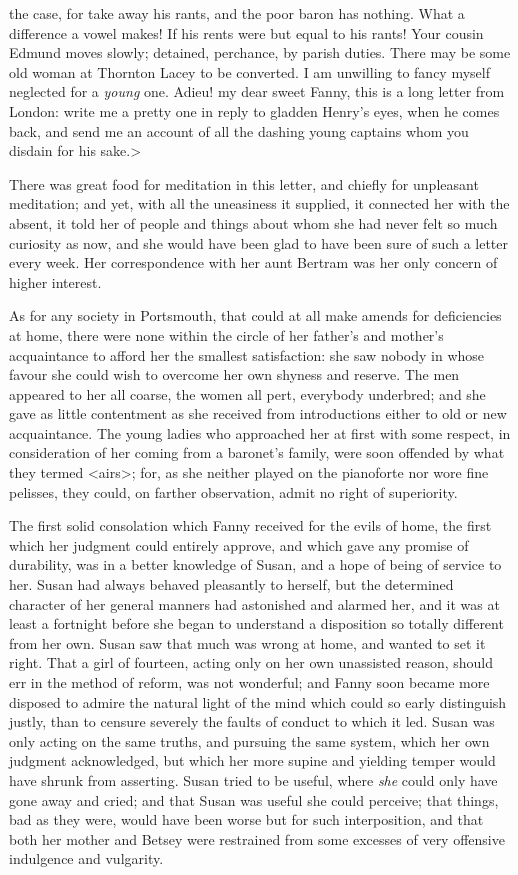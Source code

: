 the case, for take away his rants, and the poor baron has nothing. What a difference a vowel makes! If his rents were but equal to his rants! Your cousin Edmund moves slowly; detained, perchance, by parish duties. There may be some old woman at Thornton Lacey to be converted. I am unwilling to fancy myself neglected for a \textit{young}  one. Adieu! my dear sweet Fanny, this is a long letter from London: write me a pretty one in reply to gladden Henry's eyes, when he comes back, and send me an account of all the dashing young captains whom you disdain for his sake.>

There was great food for meditation in this letter, and chiefly for unpleasant meditation; and yet, with all the uneasiness it supplied, it connected her with the absent, it told her of people and things about whom she had never felt so much curiosity as now, and she would have been glad to have been sure of such a letter every week. Her correspondence with her aunt Bertram was her only concern of higher interest.

As for any society in Portsmouth, that could at all make amends for deficiencies at home, there were none within the circle of her father's and mother's acquaintance to afford her the smallest satisfaction: she saw nobody in whose favour she could wish to overcome her own shyness and reserve. The men appeared to her all coarse, the women all pert, everybody underbred; and she gave as little contentment as she received from introductions either to old or new acquaintance. The young ladies who approached her at first with some respect, in consideration of her coming from a baronet's family, were soon offended by what they termed <airs>; for, as she neither played on the pianoforte nor wore fine pelisses, they could, on farther observation, admit no right of superiority.

The first solid consolation which Fanny received for the evils of home, the first which her judgment could entirely approve, and which gave any promise of durability, was in a better knowledge of Susan, and a hope of being of service to her. Susan had always behaved pleasantly to herself, but the determined character of her general manners had astonished and alarmed her, and it was at least a fortnight before she began to understand a disposition so totally different from her own. Susan saw that much was wrong at home, and wanted to set it right. That a girl of fourteen, acting only on her own unassisted reason, should err in the method of reform, was not wonderful; and Fanny soon became more disposed to admire the natural light of the mind which could so early distinguish justly, than to censure severely the faults of conduct to which it led. Susan was only acting on the same truths, and pursuing the same system, which her own judgment acknowledged, but which her more supine and yielding temper would have shrunk from asserting. Susan tried to be useful, where \textit{she}  could only have gone away and cried; and that Susan was useful she could perceive; that things, bad as they were, would have been worse but for such interposition, and that both her mother and Betsey were restrained from some excesses of very offensive indulgence and vulgarity.

